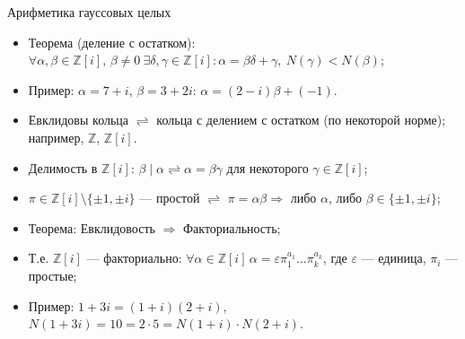 \documentclass[serif, aspectratio=169]{beamer}
\begin{document}
\begin{frame}{Арифметика гауссовых целых}
    \begin{itemize}
        \item Теорема (деление с остатком): $\forall \alpha,\beta\in\mathbb{Z}[i],\, \beta\ne0\ \exists \delta,\gamma\in\mathbb{Z}[i]: \alpha=\beta \delta+\gamma,\ N(\gamma)<N(\beta)$;
        \item Пример: $\alpha=7+i$, $\beta=3+2i$: $\alpha=(2-i)\beta + (-1)$.
        \item Евклидовы кольца $\rightleftharpoons$ кольца с делением с остатком (по некоторой норме); например, $\mathbb{Z}$, $\mathbb{Z}[i]$.
        \item Делимость в $\mathbb{Z}[i]$: $\beta\mid \alpha\rightleftharpoons \alpha=\beta \gamma$ для некоторого $\gamma\in\mathbb{Z}[i]$;
        \item $\pi\in\mathbb{Z}[i]\setminus\{\pm1,\pm i\}$ --- простой $\rightleftharpoons$ $\pi=\alpha\beta \Rightarrow$ либо $\alpha$, либо $\beta\in\{\pm1,\pm i\}$;
        \item Теорема: Евклидовость $\Rightarrow$ Факториальность;
        \item Т.е. $\mathbb{Z}[i]$ --- факториально: $\forall\alpha\in\mathbb{Z}[i]\,\alpha=\varepsilon \pi_1^{a_1}\dots\pi_k^{a_k}$, где $\varepsilon$ --- единица, $\pi_i$ --- простые;
        \item Пример: $1+3i=(1+i)(2+i)$, $N(1+3i)=10=2\cdot5=N(1+i)\cdot N(2+i)$.
    \end{itemize}
\end{frame}
\end{document}
